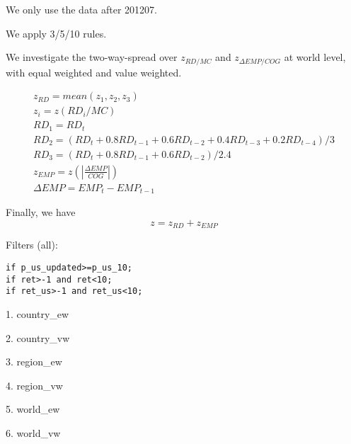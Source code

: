 

\usepackage[T1]{fontenc}




\thispagestyle{fancy}

\newcommand{\code}{\texttt}
\newcommand*{\Commonpath}{20190121/one-way-new-decile}


We only use the data after 201207.

We apply 3/5/10 rules.

We investigate the two-way-spread over $z_{RD/MC}$ and $z_{\Delta EMP/COG}$ at world level, with equal weighted and value weighted. 


$$
\begin{aligned}
& z_{RD} = mean(z_1, z_2, z_3) \\
& z_i = z(RD_i/MC) \\
& RD_1 = RD_t \\
& RD_2 = (RD_t + 0.8RD_{t-1} + 0.6RD_{t-2} + 0.4RD_{t-3} + 0.2RD_{t-4})/3 \\
& RD_3 = (RD_t + 0.8RD_{t-1} + 0.6RD_{t-2})/2.4 
& \\
& z_{EMP} = z(|\frac{\Delta EMP}{COG}|) \\
& \Delta EMP = EMP_t - EMP_{t-1}
\end{aligned}
$$

Finally, we have
$$
z = z_{RD} + z_{EMP}
$$


Filters (all):

\code{if p\_us\_updated>=p\_us\_10;} \\
\code{if ret>-1 and ret<10;} \\
\code{if ret\_us>-1 and ret\_us<10;} \\


\small

% 

% 

1. country\_ew


2. country\_vw


3. region\_ew


4. region\_vw


5. world\_ew


6. world\_vw



